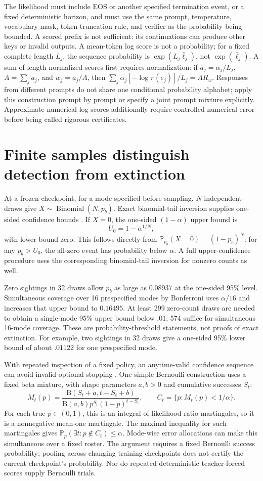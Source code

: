 \documentclass[11pt]{article}
\newcommand{\Prb}{\mathbb P}
\begin{document}
The likelihood must include EOS or another specified termination event,
or a fixed deterministic horizon, and must use the same prompt, temperature,
vocabulary mask, token-truncation rule, and verifier as the probability being
bounded. A scored prefix is not sufficient: its continuations can produce
other keys or invalid outputs. A mean-token log score is not a probability;
for a fixed complete length $L_j$, the sequence probability is
$\exp(L_j\bar\ell_j)$, not $\exp(\bar\ell_j)$.
A sum of length-normalized scores first requires normalization:
if $a_j=\alpha_j/L_j$, $A=\sum_j a_j$, and $w_j=a_j/A$, then
$\sum_j\alpha_j[-\log\pi(e_j)]/L_j=A R_w$.
Responses from different prompts do not share one conditional probability
alphabet; apply this construction prompt by prompt or specify a joint prompt
mixture explicitly. Approximate numerical log scores additionally require
controlled numerical error before being called rigorous certificates.

\section{Finite samples distinguish detection from extinction}
At a frozen checkpoint, for a mode specified before sampling, $N$
independent draws give $X\sim\operatorname{Binomial}(N,p_b)$.
Exact binomial-tail inversion supplies one-sided confidence bounds
\cite{clopper1934}. If $X=0$, the one-sided $(1-\alpha)$ upper bound is
\[
 U_0=1-\alpha^{1/N},
\]
with lower bound zero. This follows directly from
$\Prb_{p_b}(X=0)=(1-p_b)^N$: for any $p_b>U_0$, the all-zero event has
probability below $\alpha$. A full upper-confidence procedure uses the
corresponding binomial-tail inversion for nonzero counts as well.

Zero sightings in 32 draws allow $p_b$ as large as $0.08937$ at the
one-sided 95\% level. Simultaneous coverage over 16 prespecified modes by
Bonferroni uses $\alpha/16$ and increases that upper bound to $0.16495$.
At least 299 zero-count draws are needed to obtain a single-mode 95\%
upper bound below $.01$; 574 suffice for simultaneous 16-mode coverage.
These are probability-threshold statements, not proofs of exact extinction.
For example, two sightings in 32 draws give a one-sided 95\% lower bound
of about $.01122$ for one prespecified mode.

With repeated inspection of a fixed policy, an anytime-valid confidence
sequence can avoid invalid optional stopping \cite{howard2021}. One simple
Bernoulli construction uses a fixed beta mixture, with shape parameters
$a,b>0$ and cumulative successes $S_t$:
\[
 M_t(p)=\frac{\mathrm B(S_t+a,t-S_t+b)}
 {\mathrm B(a,b)p^{S_t}(1-p)^{t-S_t}},\qquad
 C_t=\{p:M_t(p)<1/\alpha\}.
\]
For each true $p\in(0,1)$, this is an integral of likelihood-ratio martingales,
so it is a nonnegative mean-one martingale. The maximal inequality for such
martingales gives
$\Prb_p(\exists t:p\notin C_t)\le\alpha$.
Mode-wise error allocations can make this simultaneous over a fixed roster.
The argument requires a fixed Bernoulli success probability; pooling across
changing training checkpoints does not certify the current checkpoint's
probability. Nor do repeated deterministic teacher-forced scores supply
Bernoulli trials.
\end{document}
